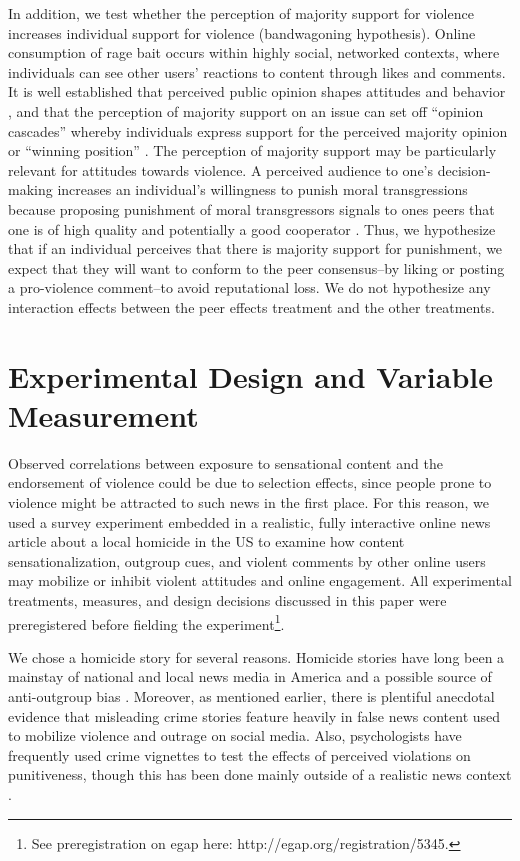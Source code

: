 In addition, we test whether the perception of majority support for violence increases individual support for violence (bandwagoning hypothesis). Online consumption of rage bait occurs within highly social, networked contexts, where individuals can see other users' reactions to content through likes and comments. It is well established that perceived public opinion shapes attitudes and behavior \citep{neubaum2017monitoring,noelleneumann1993spiral}, and that the perception of majority support on an issue can set off ``opinion cascades'' whereby individuals express support for the perceived majority opinion or ``winning position'' \citep{rothschild2014public, mutz1992impersonal}. The perception of majority support may be particularly relevant for attitudes towards violence. A perceived audience to one's decision-making increases an individual's willingness to punish moral transgressions \citep{kurzban2007audience} because proposing punishment of moral transgressors signals to ones peers that one is of high quality and potentially a good cooperator \citep{fessler2003strategy,gintis2001costly}. Thus, we hypothesize that if an individual perceives that there is majority support for punishment, we expect that they will want to conform to the peer consensus--by liking or posting a pro-violence comment--to avoid reputational loss. We do not hypothesize any interaction effects between the peer effects treatment and the other treatments.

\section{Experimental Design and Variable Measurement}

Observed correlations between exposure to sensational content and the endorsement of violence could be due to selection effects, since people prone to violence might be attracted to such news in the first place. For this reason, we used a survey experiment embedded in a realistic, fully interactive online news article about a local homicide in the US to examine how content sensationalization, outgroup cues, and violent comments by other online users may mobilize or inhibit violent attitudes and online engagement. All experimental treatments, measures, and design decisions discussed in this paper were preregistered before fielding the experiment\footnote{See preregistration on egap here: http://egap.org/registration/5345.}.

We chose a homicide story for several reasons. Homicide stories have long been a mainstay of national and local news media in America and a possible source of anti-outgroup bias \citep{gilliam2000prime}. Moreover, as mentioned earlier, there is plentiful anecdotal evidence that misleading crime stories feature heavily in false news content used to mobilize violence and outrage on social media. Also, psychologists have frequently used crime vignettes to test the effects of perceived violations on punitiveness, though this has been done mainly outside of a realistic news context \citep{fincher2016perceptual, tetlock2007,gross2008framing}. 

